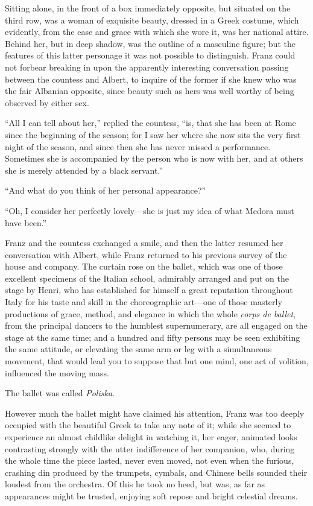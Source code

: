 Sitting alone, in the front of a box immediately opposite, but situated
on the third row, was a woman of exquisite beauty, dressed in a Greek
costume, which evidently, from the ease and grace with which she wore
it, was her national attire. Behind her, but in deep shadow, was the
outline of a masculine figure; but the features of this latter
personage it was not possible to distinguish. Franz could not forbear
breaking in upon the apparently interesting conversation passing
between the countess and Albert, to inquire of the former if she knew
who was the fair Albanian opposite, since beauty such as hers was well
worthy of being observed by either sex.

“All I can tell about her,” replied the countess, “is, that she has
been at Rome since the beginning of the season; for I saw her where she
now sits the very first night of the season, and since then she has
never missed a performance. Sometimes she is accompanied by the person
who is now with her, and at others she is merely attended by a black
servant.”

“And what do you think of her personal appearance?”

“Oh, I consider her perfectly lovely—she is just my idea of what Medora
must have been.”

Franz and the countess exchanged a smile, and then the latter resumed
her conversation with Albert, while Franz returned to his previous
survey of the house and company. The curtain rose on the ballet, which
was one of those excellent specimens of the Italian school, admirably
arranged and put on the stage by Henri, who has established for himself
a great reputation throughout Italy for his taste and skill in the
choreographic art—one of those masterly productions of grace, method,
and elegance in which the whole \textit{corps de ballet}, from the principal
dancers to the humblest supernumerary, are all engaged on the stage at
the same time; and a hundred and fifty persons may be seen exhibiting
the same attitude, or elevating the same arm or leg with a simultaneous
movement, that would lead you to suppose that but one mind, one act of
volition, influenced the moving mass.

The ballet was called \textit{Poliska}.

However much the ballet might have claimed his attention, Franz was too
deeply occupied with the beautiful Greek to take any note of it; while
she seemed to experience an almost childlike delight in watching it,
her eager, animated looks contrasting strongly with the utter
indifference of her companion, who, during the whole time the piece
lasted, never even moved, not even when the furious, crashing din
produced by the trumpets, cymbals, and Chinese bells sounded their
loudest from the orchestra. Of this he took no heed, but was, as far as
appearances might be trusted, enjoying soft repose and bright celestial
dreams.

